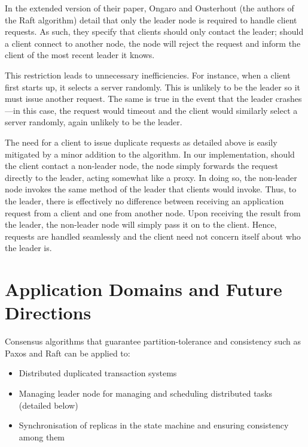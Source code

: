 \documentclass[12pt, a4paper]{article}
\begin{document}
In the extended version of their paper, Ongaro and Ousterhout (the authors of the Raft algorithm) detail that only the leader node is required to handle client requests. As such, they specify that clients should only contact the leader; should a client connect to another node, the node will reject the request and inform the client of the most recent leader it knows.

This restriction leads to unnecessary inefficiencies. For instance, when a client first starts up, it selects a server randomly. This is unlikely to be the leader so it must issue another request. The same is true in the event that the leader crashes---in this case, the request would timeout and the client would similarly select a server randomly, again unlikely to be the leader.

The need for a client to issue duplicate requests as detailed above is easily mitigated by a minor addition to the algorithm. In our implementation, should the client contact a non-leader node, the node simply forwards the request directly to the leader, acting somewhat like a proxy. In doing so, the non-leader node invokes the same method of the leader that clients would invoke. Thus, to the leader, there is effectively no difference between receiving an application request from a client and one from another node. Upon receiving the result from the leader, the non-leader node will simply pass it on to the client. Hence, requests are handled seamlessly and the client need not concern itself about who the leader is.


\section{Application Domains and Future Directions}\label{sec:future}
Consensus algorithms that guarantee partition-tolerance and consistency such as Paxos and Raft can be applied to:
\begin{itemize}
    \item Distributed duplicated transaction systems
    \item Managing leader node for managing and scheduling distributed tasks (detailed below)
    \item Synchronisation of replicas in the state machine and ensuring consistency among them
\end{itemize}
\end{document}
